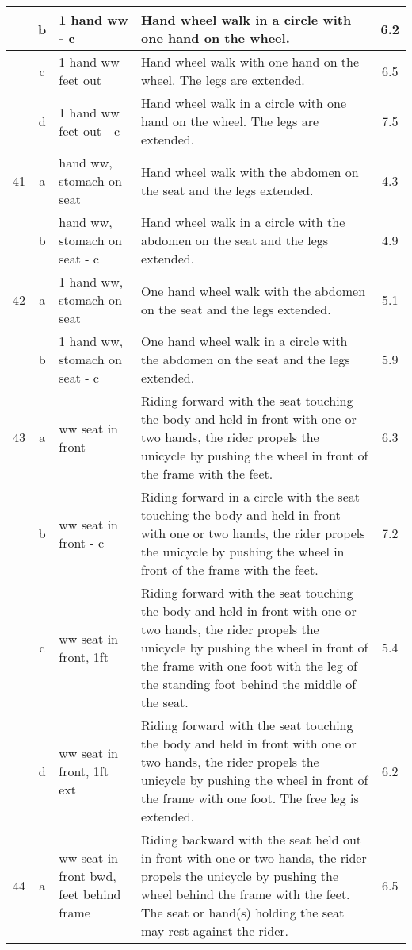 \begin{longtable}{|r|c|p{4cm}|p{8cm}|c|}
\hline
  & b & 1 hand ww - c & Hand wheel walk in a circle with one hand on the wheel. & 6.2 \\ 
\hline
  & c & 1 hand ww feet out  & Hand wheel walk with one hand on the wheel. The legs are extended.  & 6.5 \\ 
\hline
  & d & 1 hand ww feet out - c  & Hand wheel walk in a circle with one hand on the wheel. The legs are extended.  & 7.5 \\ 
\hline
41  & a & hand ww, stomach on seat  & Hand wheel walk with the abdomen on the seat and the legs extended. & 4.3 \\ 
\hline
  & b & hand ww, stomach on seat - c  & Hand wheel walk in a circle with the abdomen on the seat and the legs extended. & 4.9 \\ 
\hline
42  & a & 1 hand ww, stomach on seat  & One hand wheel walk with the abdomen on the seat and the legs extended. & 5.1 \\ 
\hline
  & b & 1 hand ww, stomach on seat - c  & One hand wheel walk in a circle with the abdomen on the seat and the legs extended. & 5.9 \\ 
\hline
43  & a & ww seat in front  & Riding forward with the seat touching the body and held in front with one or two hands, the rider propels the unicycle by pushing the wheel in front of the frame with the feet.  & 6.3 \\ 
\hline
  & b & ww seat in front - c  & Riding forward in a circle with the seat touching the body and held in front with one or two hands, the rider propels the unicycle by pushing the wheel in front of the frame with the feet.  & 7.2 \\ 
\hline
  & c & ww seat in front, 1ft & Riding forward with the seat touching the body and held in front with one or two hands, the rider propels the unicycle by pushing the wheel in front of the frame with one foot with the leg of the standing foot behind the middle of the seat.  & 5.4 \\ 
\hline
  & d & ww seat in front, 1ft ext & Riding forward with the seat touching the body and held in front with one or two hands, the rider propels the unicycle by pushing the wheel in front of the frame with one foot. The free leg is extended.  & 6.2 \\ 
\hline
44  & a & ww seat in front bwd, feet behind frame & Riding backward with the seat held out in front with one or two hands, the rider propels the unicycle by pushing the wheel behind the frame with the feet. The seat or hand(s) holding the seat may rest against the rider. & 6.5 \\ 

\end{longtable}
